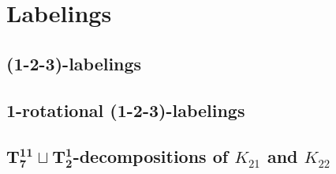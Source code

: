 \chapter{Labelings}
\label{app_glossary}

\section{(1-2-3)-labelings}

\newpage
\section{1-rotational (1-2-3)-labelings}

\newpage
\section{$\mathbf{T_{7}^{11}}\sqcup\mathbf{T_{2}^{1}}$-decompositions of $K_{21}$ and $K_{22}$}
    
    
